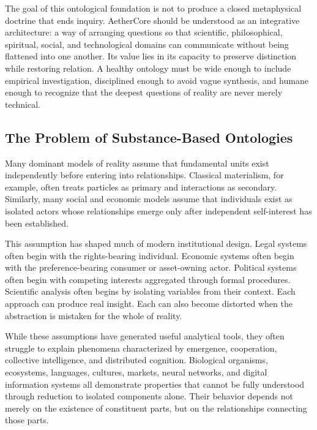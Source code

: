 \documentclass[12pt]{article}
\begin{document}

The goal of this ontological foundation is not to produce a closed metaphysical doctrine that ends inquiry. AetherCore should be understood as an integrative architecture: a way of arranging questions so that scientific, philosophical, spiritual, social, and technological domains can communicate without being flattened into one another. Its value lies in its capacity to preserve distinction while restoring relation. A healthy ontology must be wide enough to include empirical investigation, disciplined enough to avoid vague synthesis, and humane enough to recognize that the deepest questions of reality are never merely technical.

\subsection{The Problem of Substance-Based Ontologies}

Many dominant models of reality assume that fundamental units exist independently before entering into relationships. Classical materialism, for example, often treats particles as primary and interactions as secondary. Similarly, many social and economic models assume that individuals exist as isolated actors whose relationships emerge only after independent self-interest has been established.

This assumption has shaped much of modern institutional design. Legal systems often begin with the rights-bearing individual. Economic systems often begin with the preference-bearing consumer or asset-owning actor. Political systems often begin with competing interests aggregated through formal procedures. Scientific analysis often begins by isolating variables from their context. Each approach can produce real insight. Each can also become distorted when the abstraction is mistaken for the whole of reality.

While these assumptions have generated useful analytical tools, they often struggle to explain phenomena characterized by emergence, cooperation, collective intelligence, and distributed cognition. Biological organisms, ecosystems, languages, cultures, markets, neural networks, and digital information systems all demonstrate properties that cannot be fully understood through reduction to isolated components alone. Their behavior depends not merely on the existence of constituent parts, but on the relationships connecting those parts.
\end{document}
